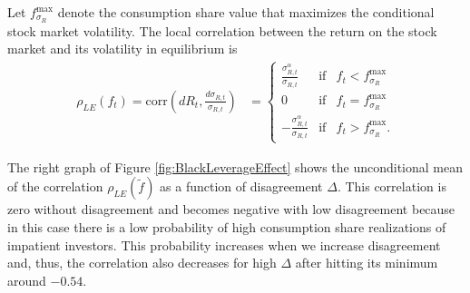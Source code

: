 \begin{prop}\label{prop:LEV}
Let $f_{\sigma_R}^{\text{max}}$ denote the consumption share value that maximizes the conditional stock market volatility. The local correlation between the return on the stock market and its volatility in equilibrium is
\begin{align}\label{eq:MP_Demand_Sig}
  	\rho_{LE}(f_t) = \text{corr} \left (dR_t, \frac{d\sigma_{R,t}}{\sigma_{R,t}} \right)
  	&= \left \lbrace \begin{array}{lcl}
  		\frac{\sigma^{\alpha}_{R,t}}{\sigma_{R,t}}  
  		& \text{if} & f_t < f_{\sigma_R}^{\text{max}} \\
  		0 & \text{if} & f_t = f_{\sigma_R}^{\text{max}} \\
  		-\frac{\sigma^{\alpha}_{R,t}}{\sigma_{R,t}}  
  		& \text{if} &f_t >f_{\sigma_R}^{\text{max}}. 
  		\end{array} \right. 
\end{align}
\end{prop}
The right graph of Figure \ref{fig:BlackLeverageEffect} shows the unconditional mean of the correlation $\rho_{LE}\left(\tilde{f}\right)$ as a function of disagreement $\Delta$. This correlation is zero without disagreement and becomes negative with low disagreement because in this case there is a low probability of high consumption share realizations of impatient investors. This probability increases when we increase disagreement and, thus, the correlation also decreases for high $\Delta$ after hitting its minimum around $-0.54$.    


